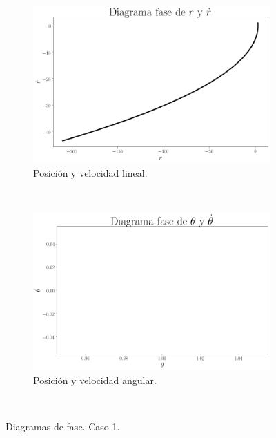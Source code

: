 \documentclass[12pt,letterpaper]{article}
\begin{document}
\begin{figure}
    \centering
    \begin{subfigure}[b]{0.8\textwidth}
        \includegraphics[width=\textwidth]{case03_phase_r_d_r}
        \caption{Posición y velocidad lineal.}
        \label{fig:case 3 phase r lagrange}
    \end{subfigure}
    ~ %
    \begin{subfigure}[b]{0.8\textwidth}
        \includegraphics[width=\textwidth]{case03_phase_theta_d_theta}
        \caption{Posición y velocidad angular.}
        \label{fig:case 3 phase theta lagrange}
    \end{subfigure}
    ~ %
    \caption{Diagramas de fase. Caso 1.}\label{fig:case 3 phase plot lagrange}
\end{figure}
\end{document}
